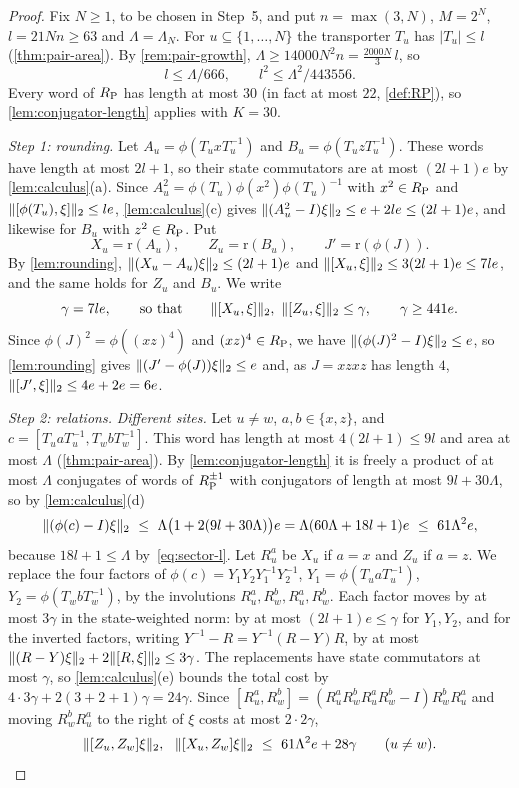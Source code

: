\begin{proof}
Fix $N\ge1$, to be chosen in Step~5, and put $n=\max(3,N)$, $M=2^N$, $l=21Nn\ge63$ and $\Lambda=\Lambda_N$. For $u\subseteq\{1,\dots,N\}$
the transporter $T_u$ has $\lvert T_u\rvert\le l$ (\cref{thm:pair-area}). By \cref{rem:pair-growth}, $\Lambda\ge14000N^2n=\frac{2000N}3\,l$,
so
\begin{equation}\label{eq:sector-l}
l\le\Lambda/666,\qquad l^2\le\Lambda^2/443556 .
\end{equation}
Every word of $R_{\mathrm P}$ has length at most $30$ (in fact at most $22$, \cref{def:RP}), so \cref{lem:conjugator-length} applies with $K=30$.

\emph{Step 1: rounding.} Let $A_u=\phi(T_uxT_u^{-1})$ and $B_u=\phi(T_uzT_u^{-1})$. These words have length at most $2l+1$, so their state
commutators are at most $(2l+1)e$ by \cref{lem:calculus}(a). Since $A_u^2=\phi(T_u)\phi(x^2)\phi(T_u)^{-1}$ with $x^2\in R_{\mathrm P}$ and
$\lVert [\phi(T_u),\xi]\rVert_2\le le$, \cref{lem:calculus}(c) gives $\lVert (A_u^2-I)\xi\rVert_2\le e+2le\le(2l+1)e$, and likewise for $B_u$ with
$z^2\in R_{\mathrm P}$. Put
\[
X_u=\mathrm r(A_u),\qquad Z_u=\mathrm r(B_u),\qquad J'=\mathrm r(\phi(J)) .
\]
By \cref{lem:rounding}, $\lVert (X_u-A_u)\xi\rVert_2\le(2l+1)e$ and $\lVert [X_u,\xi]\rVert_2\le3(2l+1)e\le7le$, and the same holds for $Z_u$ and $B_u$. We
write
\[
\gamma=7le,\qquad\text{so that}\qquad\lVert [X_u,\xi]\rVert_2,\ \lVert [Z_u,\xi]\rVert_2\le\gamma,\qquad \gamma\ge441e .
\]
Since $\phi(J)^2=\phi((xz)^4)$ and $(xz)^4\in R_{\mathrm P}$, we have $\lVert (\phi(J)^2-I)\xi\rVert_2\le e$, so \cref{lem:rounding} gives
$\lVert (J'-\phi(J))\xi\rVert_2\le e$ and, as $J=xzxz$ has length $4$, $\lVert [J',\xi]\rVert_2\le4e+2e=6e$.

\emph{Step 2: relations.} \emph{Different sites.} Let $u\ne w$, $a,b\in\{x,z\}$, and $c=[T_uaT_u^{-1},T_wbT_w^{-1}]$. This word has length
at most $4(2l+1)\le9l$ and area at most $\Lambda$ (\cref{thm:pair-area}). By \cref{lem:conjugator-length} it is freely a product of at most
$\Lambda$ conjugates of words of $R_{\mathrm P}^{\pm1}$ with conjugators of length at most $9l+30\Lambda$, so by \cref{lem:calculus}(d)
\[
\hs{(\phi(c)-I)\xi}\ \le\ \Lambda\bigl(1+2(9l+30\Lambda)\bigr)e=\Lambda(60\Lambda+18l+1)e\ \le\ 61\Lambda^2e,
\]
because $18l+1\le\Lambda$ by~\eqref{eq:sector-l}. Let $R^a_u$ be $X_u$ if $a=x$ and $Z_u$ if $a=z$. We replace the four factors of
$\phi(c)=Y_1Y_2Y_1^{-1}Y_2^{-1}$, $Y_1=\phi(T_uaT_u^{-1})$, $Y_2=\phi(T_wbT_w^{-1})$, by the involutions $R^a_u,R^b_w,R^a_u,R^b_w$. Each
factor moves by at most $3\gamma$ in the state-weighted norm: by at most $(2l+1)e\le\gamma$ for $Y_1,Y_2$, and for the inverted factors,
writing $Y^{-1}-R=Y^{-1}(R-Y)R$, by at most $\lVert (R-Y)\xi\rVert_2+2\lVert [R,\xi]\rVert_2\le3\gamma$. The replacements have state commutators at most
$\gamma$, so \cref{lem:calculus}(e) bounds the total cost by $4\cdot3\gamma+2(3+2+1)\gamma=24\gamma$. Since
$[R^a_u,R^b_w]=(R^a_uR^b_wR^a_uR^b_w-I)R^b_wR^a_u$ and moving $R^b_wR^a_u$ to the right of $\xi$ costs at most $2\cdot2\gamma$,
\begin{equation}\label{eq:sector-comm}
\hs{[Z_u,Z_w]\xi},\ \ \hs{[X_u,Z_w]\xi}\ \le\ 61\Lambda^2e+28\gamma\qquad(u\ne w).
\end{equation}


\end{proof}
